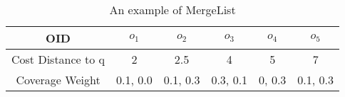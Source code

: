 \documentclass[a4paper]{article}
\begin{document}
\begin{table}[h]
\centering
\begin{tabular}{|c|c|c|c|c|c|}
\hline
 OID & $o_1$ & $o_2$ & $o_3$ & $o_4$ & $o_5$\\
\hline
 Cost Distance to q& 2 & 2.5 & 4 & 5 & 7 \\
\hline
 Coverage Weight &0.1, 0.0&0.1, 0.3&0.3, 0.1&0, 0.3&0.1, 0.3\\
\hline
\end{tabular}
\caption{An example of MergeList} \label{T6}
\end{table}
\end{document}
